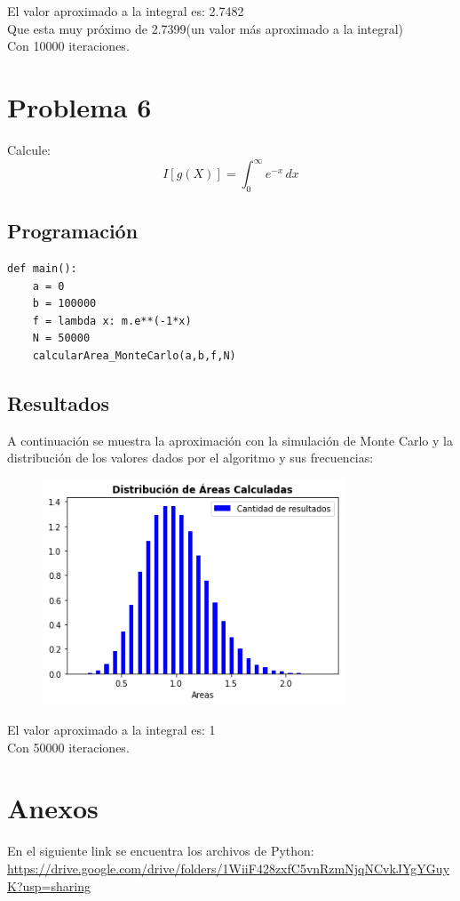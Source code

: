 \documentclass[a4paper,12pt]{article}
\begin{document}
    El valor aproximado a la integral es: 2.7482\\
    Que esta muy próximo de 2.7399(un valor más aproximado a la integral)\\
    Con 10000 iteraciones.

    \section{Problema 6}
    Calcule:
    \begin{equation}
        I[g(X)] = \int_{0}^{\infty} e^{-x} \,dx
    \end{equation}

    \subsection{Programación}
\begin{lstlisting}
def main():
    a = 0
    b = 100000
    f = lambda x: m.e**(-1*x)
    N = 50000
    calcularArea_MonteCarlo(a,b,f,N)
\end{lstlisting}
\subsection{Resultados}
A continuación se muestra la aproximación con la simulación de Monte Carlo y 
la distribución de los valores dados por el algoritmo y sus frecuencias:
\begin{figure}[h]
    \centering
    \includegraphics[width=0.8\textwidth]{ejer6.png}
\end{figure}

El valor aproximado a la integral es: 1\\
Con 50000 iteraciones.
\section{Anexos}
En el siguiente link se encuentra los archivos de Python:\\
\url{https://drive.google.com/drive/folders/1WiiF428zxfC5vnRzmNjqNCvkJYgYGuyK?usp=sharing}
\end{document}
